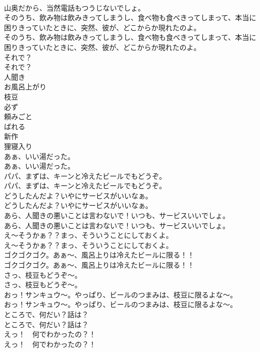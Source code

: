 \documentclass[8pt]{extreport}
\begin{document}
\begin{CJK}{UTF8}{min}
\\	山奥だから、当然電話もつうじないでしょ。 
\\	そのうち、飲み物は飲みきってしまうし、食べ物も食べきってしまって、本当に困りきっていたときに、突然、彼が、どこからか現れたのよ。	
\\	そのうち、飲み物は飲みきってしまうし、食べ物も食べきってしまって、本当に困りきっていたときに、突然、彼が、どこからか現れたのよ。 
\\	それで？	
\\	それで？ 
\\	人聞き
\\	お風呂上がり
\\	枝豆
\\	必ず
\\	頼みごと
\\	ばれる
\\	新作
\\	狸寝入り
\\	あぁ、いい湯だった。	
\\	あぁ、いい湯だった。 
\\	パパ、まずは、キーンと冷えたビールでもどうぞ。	
\\	パパ、まずは、キーンと冷えたビールでもどうぞ。 
\\	どうしたんだよ？いやにサービスがいいなぁ。	
\\	どうしたんだよ？いやにサービスがいいなぁ。 
\\	あら、人聞きの悪いことは言わないで！いつも、サービスいいでしょ。	
\\	あら、人聞きの悪いことは言わないで！いつも、サービスいいでしょ。 
\\	え～そうかぁ？？まっ、そういうことにしておくよ。	
\\	え～そうかぁ？？まっ、そういうことにしておくよ。 
\\	ゴクゴクゴク。あぁ～、風呂上りは冷えたビールに限る！！	
\\	ゴクゴクゴク。あぁ～、風呂上りは冷えたビールに限る！！ 
\\	さっ、枝豆もどうぞ～。	
\\	さっ、枝豆もどうぞ～。 
\\	おっ！サンキュウ～。やっぱり、ビールのつまみは、枝豆に限るよな～。	
\\	おっ！サンキュウ～。やっぱり、ビールのつまみは、枝豆に限るよな～。 
\\	ところで、何だい？話は？	
\\	ところで、何だい？話は？ 
\\	えっ！　何でわかったの？！	
\\	えっ！　何でわかったの？！ 

\end{CJK}
\end{document}
